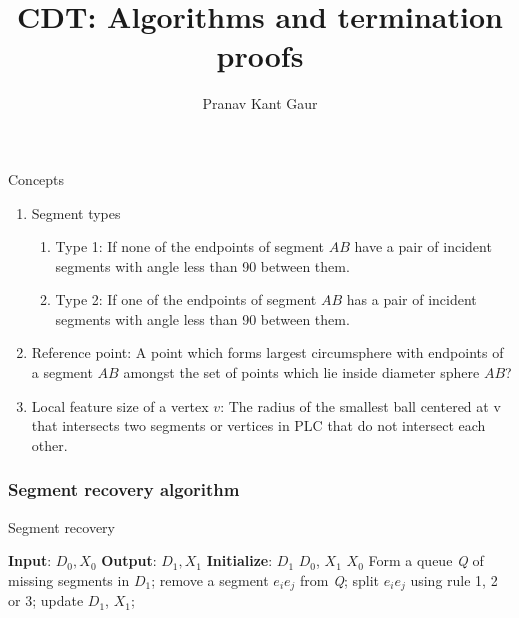 \documentclass{beamer}
\title[CDT]{CDT: Algorithms and termination proofs}
\author{Pranav Kant Gaur}
\institute[BARC, India]{Computer Division, \newline Bhabha Atomic Research Centre, Mumbai, India}
\date{}
\begin{document}
\begin{frame}
  \titlepage
\end{frame}

\begin{frame}{Concepts}
\begin{enumerate}
    \item Segment types
    \begin{enumerate}
        \item Type 1:\newline
            If none of the endpoints of segment $AB$ have a pair of incident segments with angle less than 90 between them.
        \item Type 2:\newline
            If one of the endpoints of segment $AB$ has a pair of incident segments with angle less than 90 between them.
    \end{enumerate}
    \item Reference point:\newline
    A point which forms largest circumsphere with endpoints of a segment $AB$ amongst the set of points which lie inside diameter sphere $AB$? 
    \item Local feature size of a vertex $v$:\newline
    The radius of the smallest ball centered at v that intersects
two segments or vertices in PLC that do not intersect each other.
\end{enumerate}
\end{frame}


\begin{frame}
\frametitle{Segment recovery algorithm}
\begin{algorithm}[H]
\caption{Segment recovery}
\begin{algorithmic}[1]
	\State \textbf{Input}: $D_0, X_0$
	\State \textbf{Output}: $D_1, X_1$
	\State \textbf{Initialize}: $D_1$ \gets $D_0$, $X_1$ \gets $X_0$
	\Repeat
	\State Form a queue \textit{Q} of missing segments in $D_1$;
	\State remove a segment $e_{i}e_{j}$ from \textit{Q};
	\State split $e_{i}e_{j}$ using rule 1, 2 or 3;
	\State update $D_1$, $X_1$;
	\EndWhile
\EndProcedure
\end{algorithmic}
\end{algorithm}
\end{frame}
\end{document}
